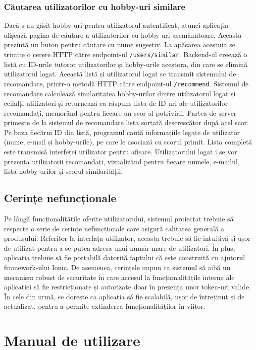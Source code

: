 \subsubsection*{Căutarea utilizatorilor cu hobby-uri similare}
Dacă s-au găsit hobby-uri pentru utilizatorul autentificat, atunci aplicația afișează pagina de căutare a utilizatorilor cu hobby-uri asemănătoare.
Aceasta prezintă un buton pentru căutare cu nume sugestiv. 
La apăsarea acestuia se trimite o cerere HTTP către endpoint-ul \texttt{/users/similar}.
Backend-ul creează o listă cu ID-urile tutoror utilizatorilor și hobby-urile acestora, din care se elimină utilizatorul logat.
Această listă și utilizatorul logat se transmit sistemului de recomandare, printr-o metodă HTTP către endpoint-ul \texttt{/recommend}.
Sistemul de recomandare calculează similaritatea hobby-urilor dintre utilizatorul logat și ceilalți utilizatori și returnează ca răspuns lista de ID-uri ale utilizatorilor recomandați, memorând pentru fiecare un scor al potrivirii.
Partea de server primește de la sistemul de recomandare lista sortată descrescător după acel scor. 
Pe baza fiecărui ID din listă, programul caută informațiile legate de utilizator (nume, e-mail și hobby-urile), pe care le asociază cu scorul primit.
Lista completă este transmisă interfeței utilizator pentru afișare.
Utilizatorului logat i se vor prezenta utilizatorii recomandați, vizualizând pentru fiecare numele, e-mailul, lista hobby-urilor și scorul similarității.


\subsection{Cerințe nefuncționale}
\label{subsec:ch4sec2sub2}
Pe lângă funcționalitățile oferite utilizatorului, sistemul proiectat trebuie să respecte o serie de cerințe nefuncționale care asigură calitatea generală a produsului.
Referitor la interfața utilizator, aceasta trebuie să fie intuitivă și ușor de utilizat pentru a se putea adresa unui număr mare de utilizatori.
În plus, aplicația trebuie să fie portabilă datorită faptului că este construită cu ajutorul framework-ului Ionic.
De asemenea, cerințele impun ca sistemul să aibă un mecanism robust de securitate în care accesul la funcționalitățile interne ale aplicației să fie restricționate și autorizate doar în prezența unor token-uri valide. 
În cele din urmă, se dorește ca aplicația să fie scalabilă, ușor de întreținut și de actualizat, pentru a permite extinderea funcționalităților în viitor. 


\section{Manual de utilizare}
\label{sec:ch4sec3}

